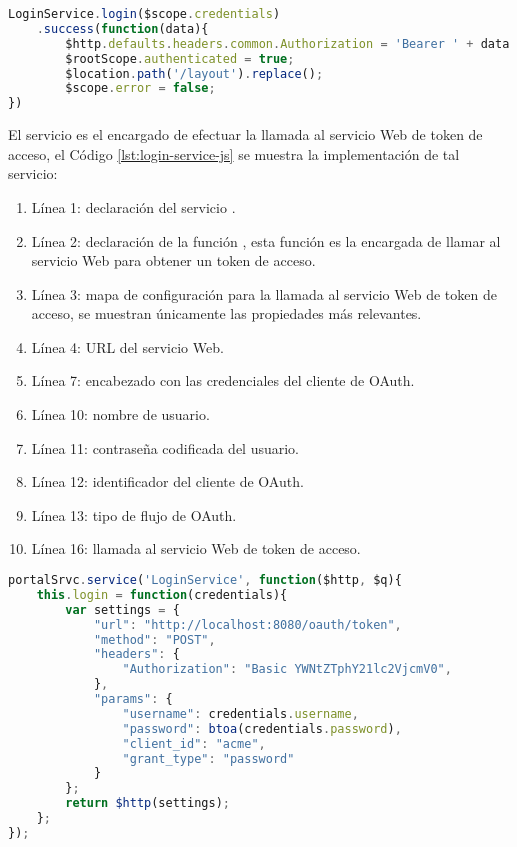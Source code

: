 \begin{lstlisting}[language=Javascript, caption={Uso del servicio que optine un token de acceso.}, captionpos=b, label={lst:login-ctrl-js}]
LoginService.login($scope.credentials)
	.success(function(data){
		$http.defaults.headers.common.Authorization = 'Bearer ' + data.access_token;
		$rootScope.authenticated = true;
		$location.path('/layout').replace();
		$scope.error = false;
})
\end{lstlisting}

El servicio  es el encargado de efectuar la llamada al servicio Web de token de acceso, el Código \ref{lst:login-service-js} se muestra la implementación de tal servicio:
\begin{enumerate}
	\item Línea 1: declaración del servicio .
	\item Línea 2: declaración de la función , esta función es la encargada de llamar al servicio Web para obtener un token de acceso.
	\item Línea 3: mapa de configuración para la llamada al servicio Web de token de acceso, se muestran únicamente las propiedades más relevantes.
	\item Línea 4: URL del servicio Web.
	\item Línea 7: encabezado con las credenciales del cliente de OAuth.
	\item Línea 10: nombre de usuario.
	\item Línea 11: contraseña codificada del usuario.
	\item Línea 12: identificador del cliente de OAuth.
	\item Línea 13: tipo de flujo de OAuth.
	\item Línea 16: llamada al servicio Web de token de acceso.
\end{enumerate}
\begin{lstlisting}[language=Javascript, caption={Servicio en AngularJS para obtener un token de acceso.}, captionpos=b, label={lst:login-service-js}]
portalSrvc.service('LoginService', function($http, $q){
	this.login = function(credentials){
		var settings = {
			"url": "http://localhost:8080/oauth/token",
			"method": "POST",
			"headers": {
				"Authorization": "Basic YWNtZTphY21lc2VjcmV0",
			},
			"params": {
				"username": credentials.username,
				"password": btoa(credentials.password),
				"client_id": "acme",
				"grant_type": "password"
			}
		};
		return $http(settings);
	};
});
\end{lstlisting}

